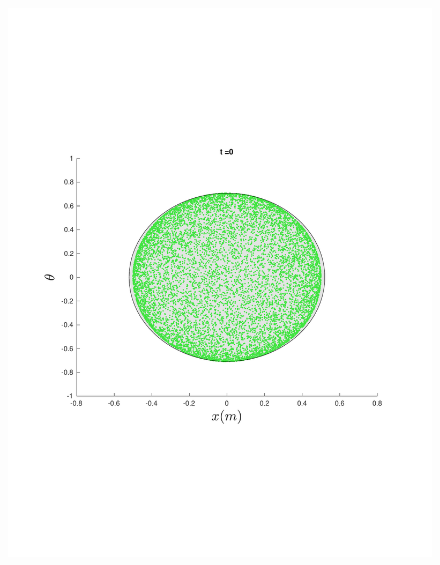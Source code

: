 \begin{figure}
{\begin{minipage}{0.5\textwidth}
\begin{minipage}[b]{0.5\textwidth}
        \includegraphics[width=\textwidth]{figures/method/FunnelSimOverlaid1funnel-1y-theta}
      \end{minipage}%
      \begin{minipage}[b]{0.5\textwidth}

\end{minipage}
\end{minipage}}
\end{figure}
